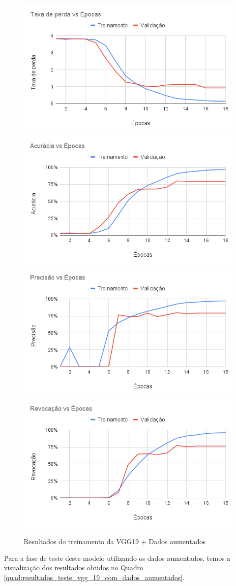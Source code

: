 \documentclass[
	12pt,				%
	oneside,			%
	a4paper,			%
	english,			%
	brazil				%
	]{abntex2ppgsi}
\begin{document}
\begin{figure}[H]
    \centering
    \caption{Resultados do treinamento da VGG19 + Dados aumentados}
    \includegraphics[width=.50\textwidth]{imagens/resultados_discussao/architecture/vgg_19/augmented/perda.png}\hfill
    \includegraphics[width=.50\textwidth]{imagens/resultados_discussao/architecture/vgg_19/augmented/acuracia.png}\bigbreak    \includegraphics[width=.50\textwidth]{imagens/resultados_discussao/architecture/vgg_19/augmented/precisao.png}\hfill
    \includegraphics[width=.50\textwidth]{imagens/resultados_discussao/architecture/vgg_19/augmented/revocacao.png}
    \label{fig:vgg_19_dados_aumentados}
\end{figure}

Para a fase de teste deste modelo utilizando os dados aumentados, temos a visualização dos resultados obtidos no Quadro \ref{quad:resultados_teste_vgg_19_com_dados_aumentados}.
\end{document}
